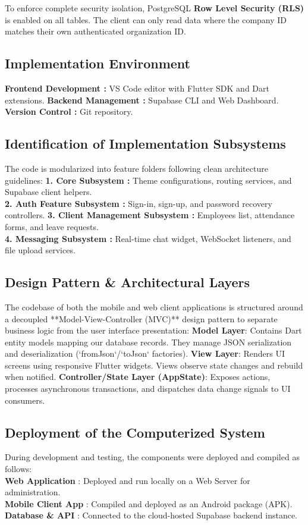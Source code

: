 To enforce complete security isolation, PostgreSQL \textbf{Row Level Security (RLS)}  is enabled on all tables. The client can only read data where the company ID matches their own authenticated organization ID.

\subsection{Implementation Environment}
\textbf{Frontend Development : } VS Code editor with Flutter SDK and Dart extensions.
\textbf{Backend Management :} Supabase CLI and Web Dashboard.\\
\textbf{Version Control :}  Git repository.

\subsection{Identification of Implementation Subsystems}
The code is modularized into feature folders following clean architecture guidelines:
\textbf{1. Core Subsystem :} Theme configurations, routing services, and Supabase client helpers.\\
\textbf{2. Auth Feature Subsystem :}  Sign-in, sign-up, and password recovery controllers.
\textbf{3. Client Management Subsystem :} Employees list, attendance forms, and leave requests.\\
\textbf{4. Messaging Subsystem :} Real-time chat widget, WebSocket listeners, and file upload services.

\subsection{Design Pattern & Architectural Layers}
The codebase of both the mobile and web client applications is structured around a decoupled **Model-View-Controller (MVC)** design pattern to separate business logic from the user interface presentation:
\textbf{Model Layer}: Contains Dart entity models mapping our database records. They manage JSON serialization and deserialization (`fromJson`/`toJson` factories).
\textbf{View Layer}: Renders UI screens using responsive Flutter widgets. Views observe state changes and rebuild when notified.
\textbf{Controller/State Layer (AppState)}: Exposes actions, processes asynchronous transactions, and dispatches data change signals to UI consumers.

\subsection{Deployment of the Computerized System}
During development and testing, the components were deployed and compiled as follows:
\\
\textbf{Web Application} : Deployed and run locally on a Web Server for administration.
\\
\textbf{Mobile Client App} : Compiled and deployed as an Android package (APK).
\\
\textbf{Database \& API} : Connected to the cloud-hosted Supabase backend instance.


